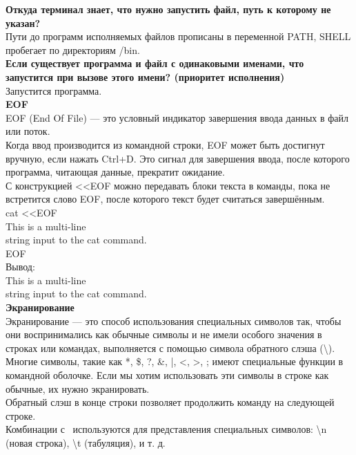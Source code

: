 \noindent \textbf{Откуда терминал знает, что нужно запустить файл, путь к которому не указан?} \\
Пути до программ исполняемых файлов прописаны в переменной PATH, SHELL пробегает по директориям /bin. \\

\noindent \textbf{Если существует программа и файл с одинаковыми именами, что запустится при вызове этого имени? (приоритет исполнения)} \\
Запустится программа. \\

\noindent \textbf{EOF} \\
EOF (End Of File) — это условный индикатор завершения ввода данных в файл или поток. \\
Когда ввод производится из командной строки, EOF может быть достигнут вручную, если нажать Ctrl+D. Это сигнал для завершения ввода, после которого программа, читающая данные, прекратит ожидание. \\
С конструкцией <\!<EOF можно передавать блоки текста в команды, пока не встретится слово EOF, после которого текст будет считаться завершённым. \\
cat <\!<EOF \\
This is a multi-line \\
string input to the cat command. \\
EOF \\
Вывод: \\
This is a multi-line \\
string input to the cat command. \\

\noindent \textbf{Экранирование} \\
Экранирование — это способ использования специальных символов так, чтобы они воспринимались как обычные символы и не имели особого значения в строках или командах, выполняется с помощью символа обратного слэша (\textbackslash). \\
Многие символы, такие как *, \$, ?, \&, |, <, >, ; имеют специальные функции в командной оболочке. Если мы хотим использовать эти символы в строке как обычные, их нужно экранировать. \\
Обратный слэш в конце строки позволяет продолжить команду на следующей строке. \\
Комбинации с \ используются для представления специальных символов: \textbackslash n (новая строка), \textbackslash t (табуляция), и т. д. \\

